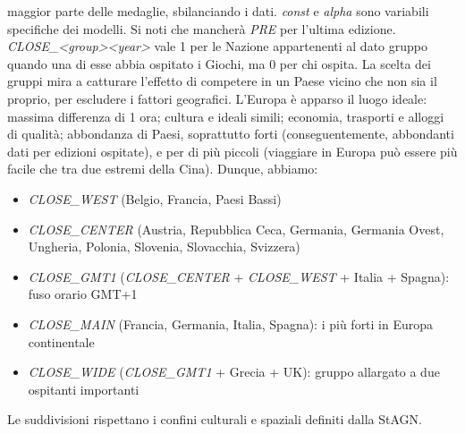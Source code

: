 maggior parte delle medaglie, sbilanciando i dati. \textit{const} e
\textit{alpha} sono variabili specifiche dei modelli.  Si noti che mancherà
\textit{PRE} per l'ultima edizione. \\
\textit{CLOSE\_<group><year>} vale 1 per le Nazione appartenenti al dato gruppo
quando una di esse abbia ospitato i Giochi, ma 0 per chi ospita. La scelta dei
gruppi mira a catturare l'effetto di competere in un Paese vicino che non sia il
proprio, per escludere i fattori geografici. L'Europa è apparso il luogo ideale:
massima differenza di 1 ora; cultura e ideali simili; economia, trasporti e
alloggi di qualità; abbondanza di Paesi, soprattutto forti (conseguentemente,
abbondanti dati per edizioni ospitate), e per di più piccoli (viaggiare in
Europa può essere più facile che tra due estremi della Cina). Dunque, abbiamo:
\begin{itemize}
    \item \textit{CLOSE\_WEST} (Belgio, Francia, Paesi Bassi)
    \item \textit{CLOSE\_CENTER} (Austria, Repubblica Ceca, Germania, Germania
    Ovest, Ungheria, Polonia, Slovenia, Slovacchia, Svizzera)
    \item \textit{CLOSE\_GMT1} (\textit{CLOSE\_CENTER} + \textit{CLOSE\_WEST} +
    Italia + Spagna): fuso orario GMT+1
    \item \textit{CLOSE\_MAIN} (Francia, Germania, Italia, Spagna): i più forti
    in Europa continentale
    \item \textit{CLOSE\_WIDE} (\textit{CLOSE\_GMT1} + Grecia + UK): gruppo
    allargato a due ospitanti importanti
\end{itemize}
Le suddivisioni rispettano i confini culturali e spaziali definiti dalla
StAGN\cite{WikipediaCentralEurope}.\\
